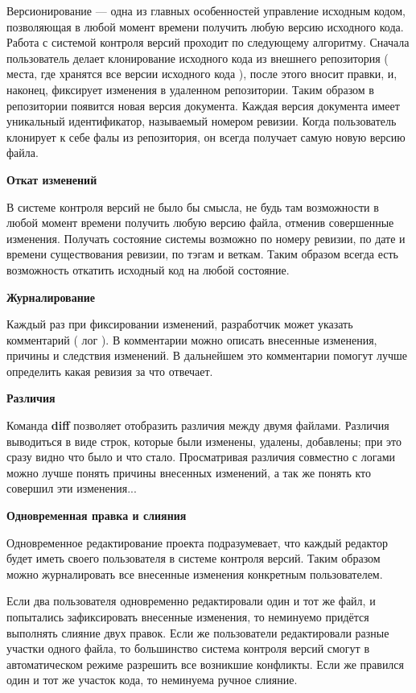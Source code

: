 Версионирование --- одна из главных особенностей управление исходным кодом, позволяющая в любой момент времени получить любую версию исходного кода. Работа с системой контроля версий  проходит по следующему алгоритму. Сначала пользователь делает клонирование исходного кода из внешнего репозитория ( места, где хранятся все версии исходного кода ), после этого вносит правки, и, наконец, фиксирует изменения в удаленном репозитории. Таким образом в репозитории появится новая версия документа. Каждая версия документа имеет уникальный идентификатор, называемый номером ревизии. Когда пользователь клонирует к себе фалы из репозитория, он всегда получает самую новую версию файла.


\textbf{ Откат изменений } %

В системе контроля версий не было бы смысла, не будь там возможности в любой момент времени получить любую версию файла, отменив совершенные изменения. Получать состояние системы возможно по номеру ревизии, по дате и времени существования ревизии, по тэгам и веткам. Таким образом всегда есть возможность откатить исходный код на любой состояние.

\textbf{ Журналирование } %

Каждый раз при фиксировании изменений, разработчик может указать комментарий ( лог ). В комментарии можно описать внесенные изменения, причины и следствия изменений. В дальнейшем это комментарии помогут лучше определить какая ревизия за что отвечает.

\textbf{ Различия } %

Команда \textbf{diff} позволяет отобразить различия между двумя файлами. Различия выводиться в виде строк, которые были изменены, удалены, добавлены; при это сразу видно что было и что стало. Просматривая различия совместно с логами можно лучше понять причины внесенных изменений, а так же понять кто совершил эти изменения...


\textbf{ Одновременная правка и слияния }%

Одновременное редактирование проекта подразумевает, что каждый редактор будет иметь своего пользователя в системе контроля версий. Таким образом можно журналировать все внесенные изменения конкретным пользователем.

Если два пользователя одновременно редактировали один и тот же файл, и попытались зафиксировать внесенные изменения, то неминуемо придётся выполнять слияние двух правок. Если же пользователи редактировали разные участки одного файла, то большинство система контроля версий смогут в автоматическом режиме разрешить все возникшие конфликты. Если же правился один и тот же участок кода, то неминуема ручное слияние.

